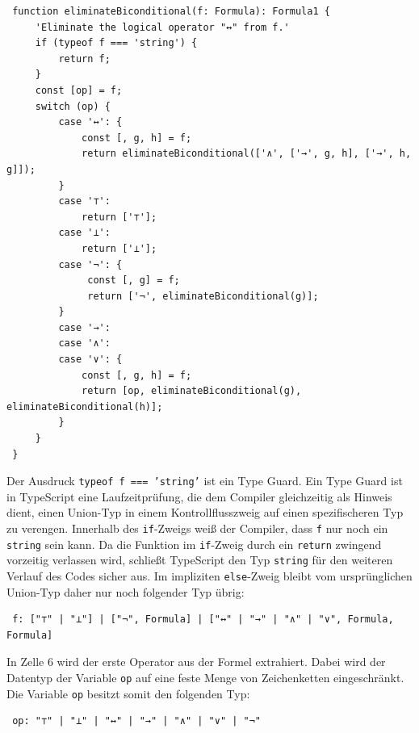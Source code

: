\begin{verbatim}
 function eliminateBiconditional(f: Formula): Formula1 {
     'Eliminate the logical operator "↔" from f.'
     if (typeof f === 'string') {
         return f;
     }
     const [op] = f;
     switch (op) {
         case '↔': {
             const [, g, h] = f;
             return eliminateBiconditional(['∧', ['→', g, h], ['→', h, g]]);
         }
         case '⊤':
             return ['⊤'];
         case '⊥':
             return ['⊥'];
         case '¬': {
              const [, g] = f;
              return ['¬', eliminateBiconditional(g)];
         }
         case '→':
         case '∧':
         case '∨': {
             const [, g, h] = f;
             return [op, eliminateBiconditional(g), eliminateBiconditional(h)];
         }
     }
 }
\end{verbatim}

Der Ausdruck \texttt{typeof f === 'string'} ist ein Type Guard.
Ein Type Guard ist in TypeScript eine Laufzeitprüfung, die dem Compiler gleichzeitig als Hinweis dient, einen Union-Typ in einem Kontrollflusszweig auf einen spezifischeren Typ zu verengen. Innerhalb des \texttt{if}-Zweigs weiß der Compiler, dass \texttt{f} nur noch ein \texttt{string} sein kann. Da die Funktion im \texttt{if}-Zweig durch ein \texttt{return} zwingend vorzeitig verlassen wird, schließt TypeScript den Typ \texttt{string} für den weiteren Verlauf des Codes sicher aus. Im impliziten \texttt{else}-Zweig bleibt vom ursprünglichen Union-Typ daher nur noch folgender Typ übrig:

\begin{verbatim}
 f: ["⊤" | "⊥"] | ["¬", Formula] | ["↔" | "→" | "∧" | "∨", Formula, Formula]
\end{verbatim}

In Zelle 6 wird der erste Operator aus der Formel extrahiert. Dabei wird der Datentyp der Variable \texttt{op} auf eine feste Menge von Zeichenketten eingeschränkt. Die Variable \texttt{op} besitzt somit den folgenden Typ:

\begin{verbatim}
 op: "⊤" | "⊥" | "↔" | "→" | "∧" | "∨" | "¬"
\end{verbatim}

